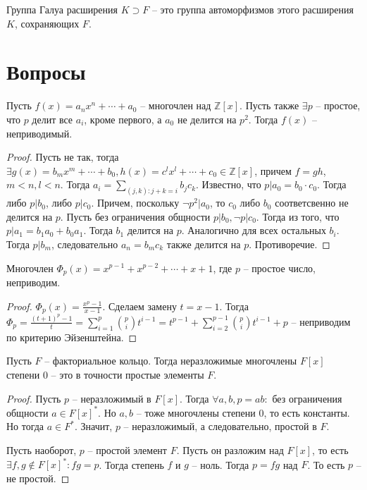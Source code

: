 \documentclass{article}
\begin{document}
\begin{definition}
    Группа Галуа расширения $K \supset F$ -- это группа автоморфизмов этого расширения $K$, сохраняющих $F$.
\end{definition}

\section{Вопросы}
\begin{statement}
    Пусть $f(x) = a_n x^n + \cdots + a_0$ -- многочлен над $\mathbb{Z}[x]$. Пусть также $\exists p$ -- простое, 
    что $p$ делит все $a_i$, кроме первого, а $a_0$ не делится на $p^2$. Тогда $f(x)$ -- неприводимый.
\end{statement}

\begin{proof}
    Пусть не так, тогда $\exists g(x) = b_m x^m + \cdots + b_0, h(x) = c^l x^l + \cdots + c_0 \in \mathbb{Z}[x]$, причем
    $f = gh$, $m < n, l < n$. Тогда $a_i = \sum_{(j, k): j + k = i} b_j c_k$. Известно, что $p | a_0 = b_0 \cdot c_0$.
    Тогда либо $p | b_0$, либо $p | c_0$. Причем, поскольку $\neg p^2 | a_0$, то $c_0$ либо $b_0$ соответсвенно не
    делится на $p$. Пусть без ограничения общности $p | b_0, \neg p | c_0$. Тогда из того, что $p | a_1 = b_1 a_0 + b_0
    a_1$. Тогда $b_1$ делится на $p$. Аналогично для всех остальных $b_i$. Тогда $p | b_m$, следовательно $a_n = b_m
    c_k$ также делится на $p$. Противоречие.
\end{proof}

\begin{statement}
    Многочлен $\Phi_p(x) = x^{p - 1} + x^{p - 2} + \cdots + x + 1$, где $p$ -- простое число, неприводим.
\end{statement}

\begin{proof}
    $\Phi_p(x) = \frac{x^p - 1}{x - 1}$. Сделаем замену $t = x - 1$. Тогда $\Phi_p = \frac{(t + 1)^p - 1}{t} = \sum_{i =
    1}^p \binom{p}{i} t^{i - 1} = t^{p - 1} + \sum_{i = 2}^{p - 1} \binom{p}{i} t^{i - 1} + p$ -- неприводим по критерию
    Эйзенштейна.
\end{proof}

\begin{statement}
    Пусть $F$ -- факториальное кольцо. Тогда неразложимые многочлены $F[x]$ степени 0 -- это в точности простые элементы
    $F$.
\end{statement}

\begin{proof}
    Пусть $p$ -- неразложимый в $F[x]$. Тогда $\forall a, b, p = ab:$ без ограничения общности $a \in F[x]^*$. Но $a, b$
    -- тоже многочлены степени 0, то есть константы. Но тогда $a \in F^*$. Значит, $p$ -- неразложимый, а следовательно,
    простой в $F$.

    Пусть наоборот, $p$ -- простой элемент $F$. Пусть он разложим над $F[x]$, то есть $\exists f, g \not \in F[x]^*: fg
    = p$. Тогда степень $f$ и $g$ -- ноль. Тогда $p = fg$ над $F$. То есть $p$ -- не простой.
\end{proof}
\end{document}

